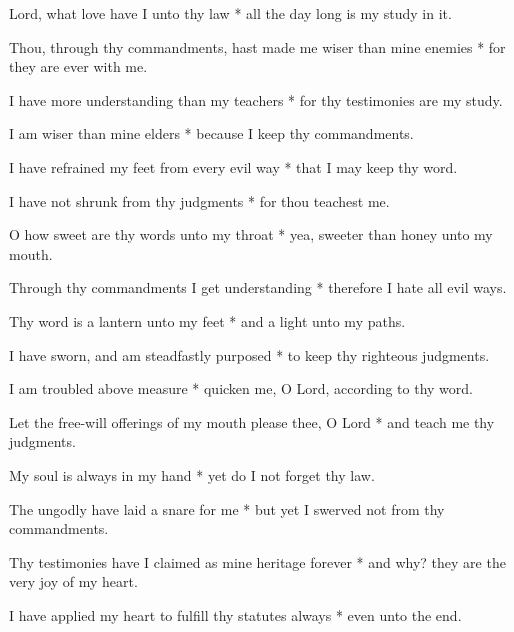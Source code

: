 Lord, what love have I unto thy law * all the day long is my study in it.

Thou, through thy commandments, hast made me wiser than mine enemies * for they are ever with me.

I have more understanding than my teachers * for thy testimonies are my study.

I am wiser than mine elders * because I keep thy commandments.

I have refrained my feet from every evil way * that I may keep thy word.

I have not shrunk from thy judgments * for thou teachest me.

O how sweet are thy words unto my throat * yea, sweeter than honey unto my mouth.

Through thy commandments I get understanding * therefore I hate all evil ways.

Thy word is a lantern unto my feet * and a light unto my paths.

I have sworn, and am steadfastly purposed * to keep thy righteous judgments.

I am troubled above measure * quicken me, O Lord, according to thy word.

Let the free-will offerings of my mouth please thee, O Lord * and teach me thy judgments.

My soul is always in my hand * yet do I not forget thy law.

The ungodly have laid a snare for me * but yet I swerved not from thy commandments.

Thy testimonies have I claimed as mine heritage forever * and why? they are the very joy of my heart.

I have applied my heart to fulfill thy statutes always * even unto the end.